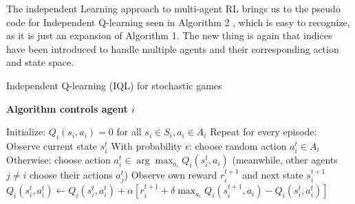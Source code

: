 \documentclass{article}
\begin{document}
\newline
\newline
The independent Learning approach to multi-agent RL brings us to the pseudo code for Independent Q-learning seen in Algorithm 2 \citep[p. 98]{marl-book}, which is easy to recognize, as it is just an expansion of Algorithm 1. The new thing is again that indices have been introduced to handle multiple agents and their corresponding action and state space.
\begin{algorithm}[H]
\caption{Independent Q-learning (IQL) for stochastic games}
\textbf{Algorithm controls agent \(i\)}
\begin{algorithmic}[1]
\State Initialize: \( Q_i(s_i, a_i) = 0 \) for all \( s_i \in S_i, a_i \in A_i \)
\State Repeat for every episode:
    \State Observe current state \( s_i^t \)
    \State With probability \( \epsilon \): choose random action \( a_i^t \in A_i \)
    \State Otherwise: choose action \( a_i^t \in \arg \max_{a_i} Q_i(s_i^t, a_i) \)
    \State (meanwhile, other agents \( j \neq i \) choose their actions \( a_j^t \))
    \State Observe own reward \( r_i^{t+1} \) and next state \( s_i^{t+1} \)
    \State \( Q_i(s_i^t, a_i^t) \gets Q_i(s_i^t, a_i^t) + \alpha [r_i^{t+1} + \delta \max_{a_i} Q_i(s_i^{t+1}, a_i) - Q_i(s_i^t, a_i^t)] \)
\EndFor
\end{algorithmic}
\end{algorithm}
\end{document}
